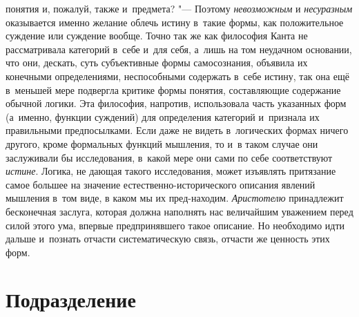 понятия и, пожалуй, также и~предмета? "--- Поэтому {\em невозможным} и
{\em несуразным} оказывается именно желание облечь истину в~такие формы, как
положительное суждение или суждение вообще. Точно так же как философия
Канта не рассматривала категорий в~себе и~для себя, а~лишь на том неудачном
основании, что они, дескать, суть субъективные формы самосознания, объявила
их конечными определениями, неспособными содержать в~себе истину, так она
ещё в~меньшей мере подвергла критике формы понятия, составляющие содержание
обычной логики. Эта философия, напротив, использовала часть указанных форм
(а~именно, функции суждений) для определения категорий и~признала их
правильными предпосылками. Если даже не видеть в~логических формах ничего
другого, кроме формальных функций мышления, то и~в таком случае они
заслуживали бы исследования, в~какой мере они сами по себе соответствуют
{\em истине}. Логика, не
дающая такого исследования, может изъявлять притязание самое большее на
значение естественно-исторического описания явлений мышления в~том виде, в
каком мы их пред-находим. {\em Аристотелю}
принадлежит бесконечная заслуга, которая должна наполнять нас
величайшим уважением перед силой этого ума, впервые предпринявшего такое
описание. Но необходимо идти дальше и~познать отчасти систематическую
связь,
отчасти же ценность этих форм.

\section[Подразделение]{Подразделение}


